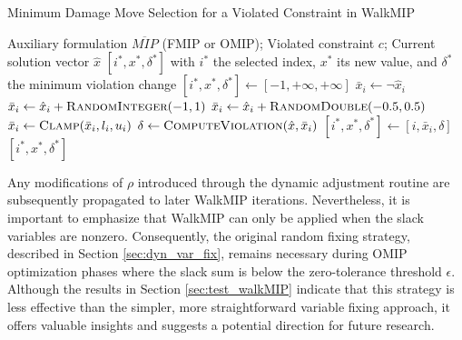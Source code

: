 \begin{algorithm}[H]
\caption{Minimum Damage Move Selection for a Violated Constraint in WalkMIP}\label{alg:min_DMG_WalkMIP}
\begin{algorithmic}[1]
\Require Auxiliary formulation $\overline{MIP}$ (FMIP or OMIP); Violated constraint $c$; Current solution vector $\hat{x}$
\Ensure $[i^*, x^*, \delta^*]$ with $i^*$ the selected index, $x^*$ its new value, and $\delta^*$ the minimum violation change
    \State $[i^*, x^*, \delta^*] \gets [-1,+\infty,+\infty]$
         $\bar{x}_i \gets \neg \hat{x}_i$
         $\bar{x}_i \gets \hat{x}_i + \Call{RandomInteger}{-1,1}$
         $\bar{x}_i \gets \hat{x}_i + \Call{RandomDouble}{-0.5,0.5}$
        \EndIf
        \State $\bar{x}_i \gets \Call{Clamp}{\bar{x}_i,l_i,u_i}$
        \State $\delta \gets \Call{ComputeViolation}{\hat{x},\bar{x}_i}$
        \If{$\delta < \delta^*$}
            \State $[i^*, x^*, \delta^*] \gets [i,\bar{x}_i,\delta]$
        \EndIf
    \EndFor
    \State \Return $[i^*, x^*, \delta^*]$
\EndFunction
\end{algorithmic}
\end{algorithm}
Any modifications of $\rho$ introduced through the dynamic adjustment routine are subsequently propagated to later WalkMIP iterations. Nevertheless, it is important to emphasize that WalkMIP can only be applied when the slack variables are nonzero. Consequently, the original random fixing strategy, described in Section \ref{sec:dyn_var_fix}, remains necessary during OMIP optimization phases where the slack sum is below the zero-tolerance threshold $\epsilon$.
Although the results in Section \ref{sec:test_walkMIP} indicate that this strategy is less effective than the simpler, more straightforward variable fixing approach, it offers valuable insights and suggests a potential direction for future research.